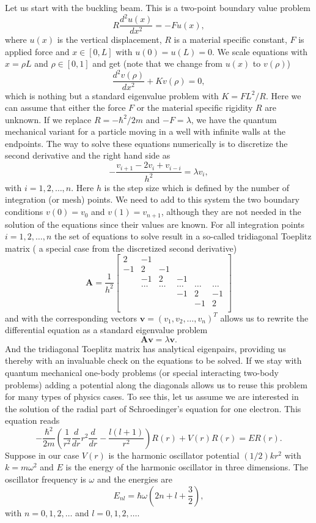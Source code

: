 \documentclass[graybox,envcountchap,sectrefs]{svmult}
\begin{document}
Let us start with the buckling beam. This is a two-point boundary
value problem
\[
R \frac{d^2 u(x)}{dx^2} = -F u(x),
\]
where $u(x)$ is the vertical displacement, $R$ is a material specific
constant, $F$ is applied force and $x \in [0,L]$ with $u(0)=u(L)=0$.
We scale equations with $x = \rho L$ and $\rho \in [0,1]$ and get
(note that we change from $u(x)$ to $v(\rho)$)
\[
\frac{d^2 v(\rho)}{dx^2} +K v(\rho)=0,
\]
which is nothing but a standard eigenvalue problem with $K=
FL^2/R$. Here we can assume that either the force $F$ or the material
specific rigidity $R$ are unknown.  If we replace $R=-\hbar^2/2m$ and
$-F=\lambda$, we have the quantum mechanical variant for a particle
moving in a well with infinite walls at the endpoints.  The way to
solve these equations numerically is to discretize the second
derivative and the right hand side as
\[
    -\frac{v_{i+1} -2v_i +v_{i-i}}{h^2}=\lambda v_i,
\]
with $i=1,2,\dots, n$. Here $h$ is the step size which is defined by
the number of integration (or mesh) points.  We need to add to this
system the two boundary conditions $v(0) =v_0$ and $v(1) = v_{n+1}$,
although they are not needed in the solution of the equations since
their values are known.  For all integration points $i=1,2,\dots, n$
the set of equations to solve result in a so-called tridiagonal
Toeplitz matrix ( a special case from the discretized second
derivative)
\[
    \mathbf{A} = \frac{1}{h^2}\begin{bmatrix}
                          2 & -1 &  &   &  & \\
                          -1 & 2 & -1 & & & \\
                           & -1 & 2 & -1 & &  \\
                           & \dots   & \dots &\dots   &\dots & \dots \\
                           &   &  &-1  &2& -1 \\
                           &    &  &   &-1 & 2 \\
                      \end{bmatrix}
\]
and with the corresponding vectors $\mathbf{v} = (v_1, v_2,
\dots,v_n)^T$ allows us to rewrite the differential equation as a
standard eigenvalue problem
\[
   \mathbf{A}\mathbf{v} = \lambda\mathbf{v}.
\]
And the tridiagonal Toeplitz matrix has analytical eigenpairs,
providing us thereby with an invaluable check on the equations to be
solved.  If we stay with quantum mechanical one-body problems (or
special interacting two-body problems) adding a potential along the
diagonals allows us to reuse this problem for many types of physics
cases.  To see this, let us assume we are interested in the solution
of the radial part of Schroedinger's equation for one electron. This
equation reads
\[
  -\frac{\hbar^2}{2 m} \left ( \frac{1}{r^2} \frac{d}{dr} r^2
  \frac{d}{dr} - \frac{l (l + 1)}{r^2} \right )R(r)
     + V(r) R(r) = E R(r).
\]
Suppose in our case $V(r)$ is the harmonic oscillator potential
$(1/2)kr^2$ with $k=m\omega^2$ and $E$ is the energy of the harmonic
oscillator in three dimensions.  The oscillator frequency is $\omega$
and the energies are
\[
E_{nl}=  \hbar \omega \left(2n+l+\frac{3}{2}\right),
\]
with $n=0,1,2,\dots$ and $l=0,1,2,\dots$.
\end{document}
